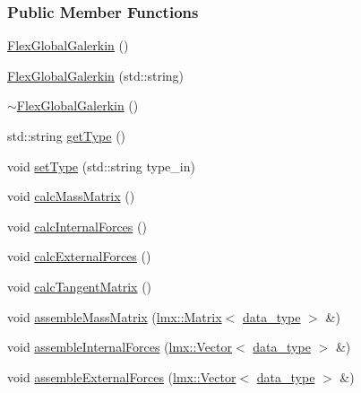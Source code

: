 \subsubsection*{Public Member Functions}
\begin{DoxyCompactItemize}
\item 
\hyperlink{classmknix_1_1_flex_global_galerkin_a29073fc9c4530cafc194be20b5a713be}{Flex\+Global\+Galerkin} ()
\item 
\hyperlink{classmknix_1_1_flex_global_galerkin_ac6b6f20633619ffb6e1d6e7d5782659f}{Flex\+Global\+Galerkin} (std\+::string)
\item 
\hyperlink{classmknix_1_1_flex_global_galerkin_af036ee6bdc4450fd457e0d95b22ace7c}{$\sim$\+Flex\+Global\+Galerkin} ()
\item 
std\+::string \hyperlink{classmknix_1_1_flex_global_galerkin_a31c93b0ce740217ce4cd12e71646d8cf}{get\+Type} ()
\item 
void \hyperlink{classmknix_1_1_flex_global_galerkin_ad731e1a7c510bbca6a49066386554e99}{set\+Type} (std\+::string type\+\_\+in)
\item 
void \hyperlink{classmknix_1_1_flex_global_galerkin_ae5bb8c27e7494b233a96d971833a0d0d}{calc\+Mass\+Matrix} ()
\item 
void \hyperlink{classmknix_1_1_flex_global_galerkin_ad9cbe937a3795ad5f9c5bd1990a14731}{calc\+Internal\+Forces} ()
\item 
void \hyperlink{classmknix_1_1_flex_global_galerkin_a2ed7079f0f2674c3556ff8dbbf3a63d3}{calc\+External\+Forces} ()
\item 
void \hyperlink{classmknix_1_1_flex_global_galerkin_a723916e65683c2ed77385ce0e3c3bd1a}{calc\+Tangent\+Matrix} ()
\item 
void \hyperlink{classmknix_1_1_flex_global_galerkin_a689a56babe9734eb504a9c948b6a3587}{assemble\+Mass\+Matrix} (\hyperlink{classlmx_1_1_matrix}{lmx\+::\+Matrix}$<$ \hyperlink{namespacemknix_a16be4b246fbf2cceb141e3a179111020}{data\+\_\+type} $>$ \&)
\item 
void \hyperlink{classmknix_1_1_flex_global_galerkin_a53478bc093d332f42128861a059c974c}{assemble\+Internal\+Forces} (\hyperlink{classlmx_1_1_vector}{lmx\+::\+Vector}$<$ \hyperlink{namespacemknix_a16be4b246fbf2cceb141e3a179111020}{data\+\_\+type} $>$ \&)
\item 
void \hyperlink{classmknix_1_1_flex_global_galerkin_acc0254dbedc2543be9051aab1acb7d99}{assemble\+External\+Forces} (\hyperlink{classlmx_1_1_vector}{lmx\+::\+Vector}$<$ \hyperlink{namespacemknix_a16be4b246fbf2cceb141e3a179111020}{data\+\_\+type} $>$ \&)

\end{DoxyCompactItemize}
